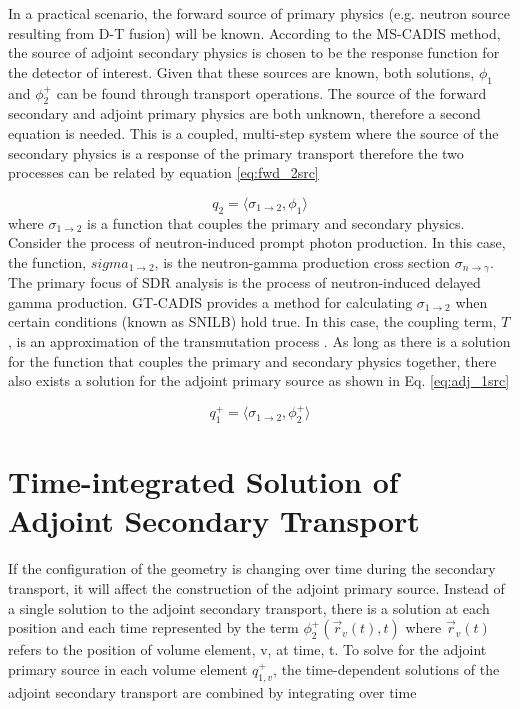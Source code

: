In a practical scenario, the forward source of primary physics (e.g. neutron
source resulting from D-T fusion) will be known.  According to the MS-CADIS
method, the source of adjoint
secondary physics is chosen to be the response function for the
detector of interest.
Given that these sources are known, both solutions, $ \phi_{1} $ and
$\phi_{2}^{+} $ can be found through transport operations.
The source of the forward secondary and adjoint primary physics are both
unknown, therefore a second equation is needed.  This is a coupled, multi-step
system where the source of the secondary physics is
a response of the primary transport therefore the two processes can be related
by equation \ref{eq:fwd_2src}

 \begin{equation}\label{eq:fwd_2src}
	 q_{2} =
	 \langle \sigma_{1\rightarrow2}, \phi_{1} \rangle
 \end{equation}
where $\sigma_{1\rightarrow2}$ is a function that couples the primary
and secondary physics.
Consider the process of neutron-induced prompt photon production.
In this case, the function, $sigma_{1\rightarrow2}$, is the neutron-gamma production
cross section $\sigma_{n\rightarrow\gamma}$.  The primary focus of SDR analysis
is the process of neutron-induced delayed gamma production. 
GT-CADIS provides a method for calculating $\sigma_{1\rightarrow2}$ when
certain conditions (known as SNILB) hold true. In this case, the
coupling term, $T$, is an approximation of the transmutation
process \cite{gtcadis}.  As long as there is a solution for the
function that couples the primary and secondary physics together,
there also exists a solution for the adjoint primary source as shown in Eq.
\ref{eq:adj_1src}

 \begin{equation}\label{eq:adj_1src}
	 q_{1}^{+} = 
	 \langle \sigma_{1\rightarrow2}, \phi_{2}^{+} \rangle
 \end{equation}


\section{Time-integrated Solution of Adjoint Secondary Transport}
If the configuration of the geometry is changing over time during
the secondary transport, it will affect the construction of the adjoint primary
source.  Instead of a single solution to the adjoint secondary transport, there
is a solution at each position and each time represented by the term
	$ \phi_{2}^{+}(\overrightarrow{r}_{v}(t), t)$
where $\overrightarrow{r}_{v}(t)$ refers to the position of volume element, v,
at time, t. 
To solve for the adjoint primary source in each volume element
$q_{1,v}^{+}$, the time-dependent solutions of the 
adjoint secondary transport are combined by integrating over time

